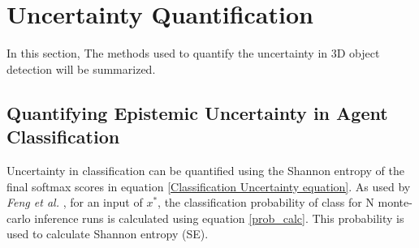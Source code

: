\documentclass[10pt,twocolumn,letterpaper]{article}
\begin{document}
        
\section{Uncertainty Quantification}
In this section, The methods used to quantify the uncertainty in 3D object detection will be summarized.
\subsection{Quantifying Epistemic Uncertainty in Agent Classification}
        \label{uncertainty in classification}
        Uncertainty in classification can be quantified using the Shannon entropy of the final softmax scores in equation \ref{Classification Uncertainty equation}. As used by \textit{Feng et al.} \cite{Feng2018}, for an input of $x^{*}$, the classification probability of class for N monte-carlo inference runs is calculated using equation \ref{prob_calc}. This probability is used to calculate Shannon entropy (SE).
\end{document}
